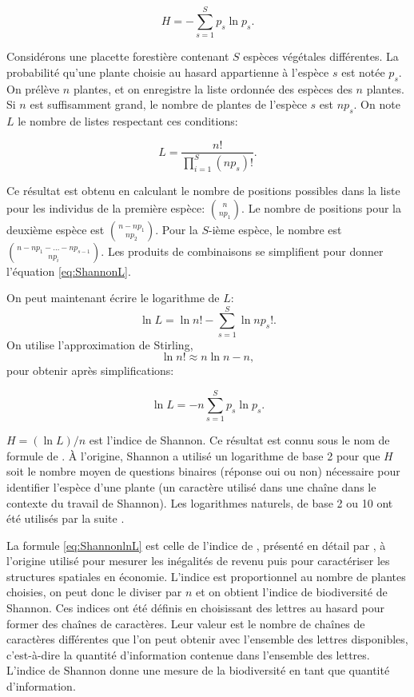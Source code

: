 \documentclass[
  11pt,
  french,
  a4paper,
  extrafontsizes,onecolumn,openright
  ]{memoir}
\begin{document}
\begin{equation}
  \label{eq:Shannon}
  H = -\sum^S_{s=1}{p_s\ln{p_s}}.
\end{equation}

Considérons une placette forestière contenant \(S\) espèces végétales différentes.
La probabilité qu'une plante choisie au hasard appartienne à l'espèce \(s\) est notée \(p_s\).
On prélève \(n\) plantes, et on enregistre la liste ordonnée des espèces des \(n\) plantes.
Si \(n\) est suffisamment grand, le nombre de plantes de l'espèce \(s\) est \(np_s\).
On note \(L\) le nombre de listes respectant ces conditions:

\begin{equation}
  \label{eq:ShannonL}
  L = \frac{n!}{\prod^S_{i=1}{\left({np}_s\right)!}}.
\end{equation}

Ce résultat est obtenu en calculant le nombre de positions possibles dans la liste pour les individus de la première espèce: \(\binom{n}{np_1}\).
Le nombre de positions pour la deuxième espèce est \(\binom{n-np_1}{np_2}\).
Pour la \(S\)-ième espèce, le nombre est \(\binom{n-np_1-\dots -np_{s-1}}{np_i}\).
Les produits de combinaisons se simplifient pour donner l'équation \eqref{eq:ShannonL}.

On peut maintenant écrire le logarithme de \(L\):
\[\ln{L}=\ln{n!}-\sum^S_{s=1}{\ln{np_s}!}.\]
On utilise l'approximation de Stirling,
\[\ln{n!}\approx n\ln{n}-n,\]
pour obtenir après simplifications:

\begin{equation}
  \label{eq:ShannonlnL}
  \ln{L} = -n\sum^S_{s=1}{p_s \ln{p_s}}.
\end{equation}

\(H=(\ln{L})/{n}\) est l'indice de Shannon.
Ce résultat est connu sous le nom de formule de \textcite{Brillouin1962}.
À l'origine, Shannon a utilisé un logarithme de base 2 pour que \(H\) soit le nombre moyen de questions binaires (réponse oui ou non) nécessaire pour identifier l'espèce d'une plante (un caractère utilisé dans une chaîne dans le contexte du travail de Shannon).
Les logarithmes naturels, de base 2 ou 10 ont été utilisés par la suite \autocite{Pielou1966a}.

La formule \eqref{eq:ShannonlnL} est celle de l'indice de \textcite{Theil1967}, présenté en détail par \textcite{Conceicao2000}, à l'origine utilisé pour mesurer les inégalités de revenu puis pour caractériser les structures spatiales en économie.
L'indice est proportionnel au nombre de plantes choisies, on peut donc le diviser par \(n\) et on obtient l'indice de biodiversité de Shannon.
Ces indices ont été définis en choisissant des lettres au hasard pour former des chaînes de caractères.
Leur valeur est le nombre de chaînes de caractères différentes que l'on peut obtenir avec l'ensemble des lettres disponibles, c'est-à-dire la quantité d'information contenue dans l'ensemble des lettres.
L'indice de Shannon donne une mesure de la biodiversité en tant que quantité d'information.
\end{document}
